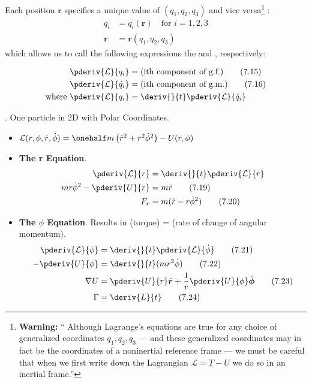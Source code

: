 \documentclass[10pt, twocolumn]{article}
\DeclareRobustCommand{\mybox}[2][gray!20]{%
	\begin{tcolorbox}[   %
		breakable,
		left=0pt,
		right=0pt,
		top=-13pt,
		bottom=0pt,
		colback=#1,
		colframe=#1,
		width=0.45\dimexpr\textwidth\relax,
		enlarge left by=0mm,
		boxsep=1pt,
		arc=0pt,outer arc=0pt,
		]
		#2
	\end{tcolorbox}
}
\newcommand\graybox[1]{ \mybox[gray!20]{\begin{align}#1\end{align}} }
\newcommand{\myspace}{\vspace{3\bigskipamount}}
\newcommand\p{\Needspace{10\baselineskip} \noindent}
\newcommand\tlab[1]{\tag{#1}\label{#1}}
\begin{document}
\myspace
\p {} Each position $\bm{r}$ specifies a unique value of $(q_1, q_2, q_3)$ and vice versa\footnote{\textbf{Warning:} `` Although Lagrange's equations are true for any choice of generalized coordinates $q_1, q_2, q_3$ --- and these generalized coordinates may in fact be the coordinates of a noninertial reference frame --- we must be careful that when we first write down the Lagrangian $\mathcal L = T - U$ we do so in an inertial frame.''}
:
\begin{align}
	q_i &= q_i(\bm{r}) \quad \text{for } i=1,2,3 \tlab{7.9} \\
	\bm{r} &= \bm{r}(q_1, q_2, q_3) \tlab{7.10}
\end{align}
which allows us to call the following expressions the  and , respectively:
\graybox{
	\pderiv{\mathcal{L}}{q_i} &= \text{(ith component of g.f.)} \tlab{7.15} \\
	\pderiv{\mathcal{L}}{\dot q_i} &= \text{(ith component of g.m.)} \tlab{7.16} \\
	\text{where } \pderiv{\mathcal{L}}{q_i} &= \deriv{}{t} \pderiv{\mathcal{L}}{\dot q_i}
	}

\myspace
\p \purple{[Example 7.2]}. One particle in 2D with Polar Coordinates. 
\begin{itemize}
	\item $\mathcal L(r, \phi, \dot r, \dot{\phi}) = \onehalf m \left( \dot r^2 + r^2 \dot \phi^2 \right) - U(r, \phi)$
	\item \textbf{The r Equation}. 
	\begin{align}
		\pderiv{\mathcal L}{r} &= \deriv{}{t}\pderiv{\mathcal L}{\dot r} \\
		mr\dot{\phi}^2 - \pderiv{U}{r} &= m\ddot r \tlab{7.19} \\
		F_r &= m(\ddot r - r \dot \phi^2) \tlab{7.20}
	\end{align}
	
	\item \textbf{The $\phi$ Equation}. Results in (torque) = (rate of change of angular momentum). 
	\begin{align}
		\pderiv{\mathcal L}{\phi} &= \deriv{}{t}\pderiv{\mathcal L}{\dot \phi} \tlab{7.21} \\
		- \pderiv{U}{\phi} &= \deriv{}{t}( m r^2 \dot \phi) \tlab{7.22} \\
		\nabla U  &= \pderiv{U}{r} \hat{\bm{r}} + \frac{1}{r}\pderiv{U}{\phi}\hat{\bm{\phi}} \tlab{7.23} \\
		\Gamma &= \deriv{L}{t} \tlab{7.24}
	\end{align}
	
\end{itemize}
\end{document}
